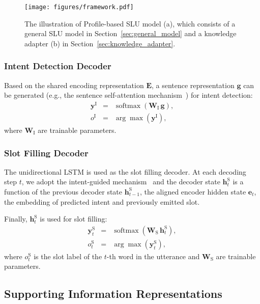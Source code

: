 \documentclass[letterpaper]{article} \usepackage{aaai22}  \usepackage{times}  \usepackage{helvet}  \usepackage{courier}  \usepackage[hyphens]{url}  \usepackage{graphicx} \urlstyle{rm} \def\UrlFont{\rm}  \usepackage{natbib}  \usepackage{caption} \DeclareCaptionStyle{ruled}{labelfont=normalfont,labelsep=colon,strut=off} \frenchspacing  \setlength{\pdfpagewidth}{8.5in}  \setlength{\pdfpageheight}{11in}  \usepackage{algorithm}
\begin{document}
\begin{figure}[t]
	\centering
	\texttt{[image: figures/framework.pdf]}
	\caption{
		The illustration of Profile-based SLU model (a), which consists of a general SLU model in Section~\ref{sec:general_model} and a knowledge adapter (b) in Section~\ref{sec:knowledge_adapter}.
    }
	\label{fig:framework}
\end{figure}

\subsubsection{Intent Detection Decoder}
Based on the shared encoding representation $\mathbf{E}$, 
a sentence representation $\mathbf{g}$ can be generated (e.g., the sentence self-attention mechanism~\citep{zhong-etal-2018-global}) for intent detection:
\begin{eqnarray}
    {\mathbf{y}}^{\mathrm{I}} &=& \operatorname{softmax}\left({\mathbf{W}}_{\mathrm{I}} \, \mathbf{g} \right), \label{eq:intent} \\
    {o}^{\mathrm{I}} &=& \arg \max ({\mathbf{y}}^{\mathrm{I}}),
\end{eqnarray}
where $\mathbf{W}_{\mathrm{I}}$ are trainable parameters. 

\subsubsection{Slot Filling Decoder}
The unidirectional LSTM is used as the slot filling decoder. 
At each decoding step $t$, we adopt the intent-guided mechanism~\citep{qin-etal-2019-stack} and the decoder state $\mathbf{h}^{\mathrm{S}}_{t}$ is a function of 
the previous decoder state ${\mathbf{h}}_{t-1}^{\mathrm{S}}$,
the aligned encoder hidden state $\mathbf{e}_t$, 
the embedding of predicted intent and previously emitted slot.

Finally, $\mathbf{h}^{\mathrm{S}}_{t}$ is used for slot filling:
\begin{eqnarray}
    {\mathbf{y}}_{t}^{\mathrm{S}} &=& \operatorname{softmax} \left({\mathbf{W}}_{\mathrm{S}} \, {\mathbf{h}}_{t}^{\mathrm{S}}\right),\label{eq:slot} \\
    {o}_{t}^{\mathrm{S}} &=& \arg \max ({\mathbf{y}}_{t}^{\mathrm{S}}),
\end{eqnarray}
where ${o}_{t}^{\mathrm{S}}$ is the slot label of the $t$-th word in the utterance and $\mathbf{W}_{\mathrm{S}}$ are trainable parameters.

\subsection{Supporting Information Representations} 
\end{document}
